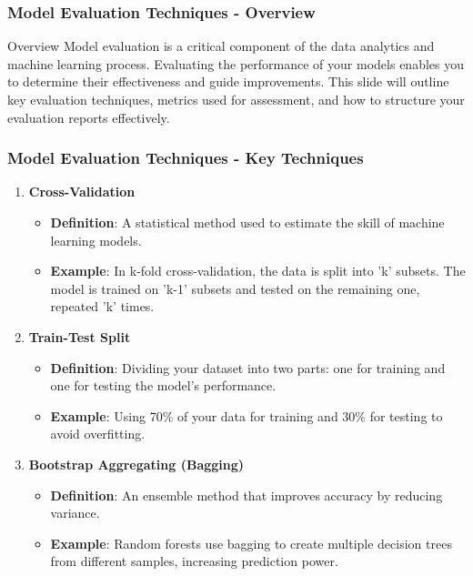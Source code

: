 \documentclass[aspectratio=169]{beamer}
\begin{document}
\begin{frame}[fragile]
    \frametitle{Model Evaluation Techniques - Overview}
    \begin{block}{Overview}
        Model evaluation is a critical component of the data analytics and machine learning process. Evaluating the performance of your models enables you to determine their effectiveness and guide improvements. This slide will outline key evaluation techniques, metrics used for assessment, and how to structure your evaluation reports effectively.
    \end{block}
\end{frame}

\begin{frame}[fragile]
    \frametitle{Model Evaluation Techniques - Key Techniques}
    \begin{enumerate}
        \item \textbf{Cross-Validation}
        \begin{itemize}
            \item \textbf{Definition}: A statistical method used to estimate the skill of machine learning models.
            \item \textbf{Example}: In k-fold cross-validation, the data is split into 'k' subsets. The model is trained on 'k-1' subsets and tested on the remaining one, repeated 'k' times.
        \end{itemize}
        
        \item \textbf{Train-Test Split}
        \begin{itemize}
            \item \textbf{Definition}: Dividing your dataset into two parts: one for training and one for testing the model's performance.
            \item \textbf{Example}: Using 70\% of your data for training and 30\% for testing to avoid overfitting.
        \end{itemize}
        
        \item \textbf{Bootstrap Aggregating (Bagging)}
        \begin{itemize}
            \item \textbf{Definition}: An ensemble method that improves accuracy by reducing variance.
            \item \textbf{Example}: Random forests use bagging to create multiple decision trees from different samples, increasing prediction power.
        \end{itemize}
    \end{enumerate}
\end{frame}
\end{document}
